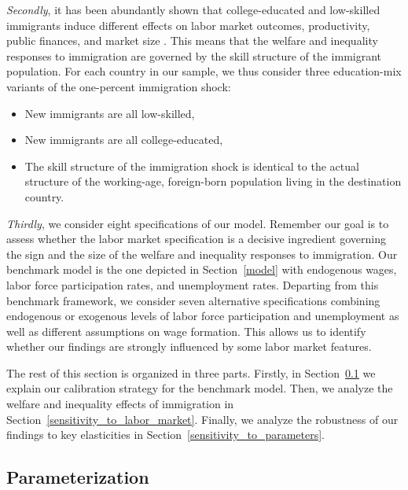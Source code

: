 \documentclass[a4paper,12pt]{article}
\begin{document}
\emph{Secondly}, it has been abundantly shown that college-educated and
low-skilled immigrants induce different effects on labor market outcomes,
productivity, public finances, and market size 
\citep[see][]{Borjas2003,
Manacorda2012, Ottaviano2012}. This means that the welfare and inequality
responses to immigration are governed by the skill structure of the
immigrant population. For each country in our sample, we thus consider three
education-mix variants of the one-percent immigration shock:
\begin{itemize}
    \item New immigrants are all low-skilled,
    \item New immigrants are all college-educated,
    \item The skill structure of the immigration shock is identical to the actual structure of the working-age, foreign-born population living in the destination country.
\end{itemize}

\emph{Thirdly}, we consider eight specifications of our model. Remember our
goal is to assess whether the labor market specification is a decisive
ingredient governing the sign and the size of the welfare and inequality
responses to immigration. Our benchmark model is the one depicted %
in Section~\ref{model} with endogenous wages, labor force participation rates, and unemployment
rates. Departing from this benchmark framework, we consider seven alternative
specifications combining endogenous or exogenous levels of labor force
participation and unemployment as well as different assumptions on wage formation. This allows us to identify whether our findings are strongly influenced by some labor market features.

The rest of this section is organized in three parts. Firstly, in Section~\ref{parameterization} we explain our calibration strategy for the benchmark
model. Then, we analyze the welfare and inequality effects of immigration in Section~\ref{sensitivity_to_labor_market}. Finally, we analyze the robustness of our findings to key elasticities in Section~\ref{sensitivity_to_parameters}.

\subsection{Parameterization} \label{parameterization}
\end{document}
